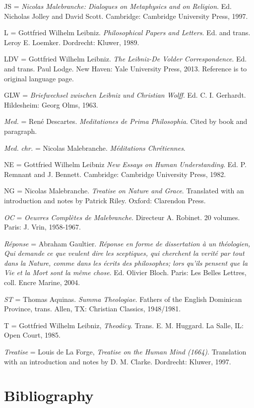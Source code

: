 \documentclass{article}
\begin{document}
JS = \emph{Nicolas Malebranche: Dialogues on Metaphysics and on
Religion}. Ed. Nicholas Jolley and David Scott. Cambridge: Cambridge
University Press, 1997.

L = Gottfried Wilhelm Leibniz. \emph{Philosophical Papers and Letters}.
Ed. and trans. Leroy E. Loemker. Dordrecht: Kluwer, 1989.

LDV = Gottfried Wilhelm Leibniz. \emph{The Leibniz-De Volder
Correspondence}. Ed. and trans. Paul Lodge. New Haven: Yale University
Press, 2013. Reference is to original language page.

GLW = \emph{Briefwechsel zwischen Leibniz und Christian Wolff}. Ed. C.
I. Gerhardt. Hildesheim: Georg Olms, 1963.

\emph{Med.} = René Descartes. \emph{Meditationes de Prima Philosophia}.
Cited by book and paragraph.

\emph{Med.} \emph{chr.} = Nicolas Malebranche. \emph{Méditations
Chrétiennes}.

NE = Gottfried Wilhelm Leibniz \emph{New Essays on Human Understanding}.
Ed. P. Remnant and J. Bennett. Cambridge: Cambridge University Press,
1982.

NG = Nicolas Malebranche. \emph{Treatise on Nature and Grace}.
Translated with an introduction and notes by Patrick Riley. Oxford:
Clarendon Press.

\emph{OC} = \emph{Oeuvres Complètes de Malebranche}. Directeur A.
Robinet. 20 volumes. Paris: J. Vrin, 1958-1967.

\emph{Réponse} = Abraham Gaultier. \emph{Réponse en forme de
dissertation à un théologien, Qui demande ce que veulent dire les
sceptiques, qui cherchent la verité par tout dans la Nature, comme dans
les écrits des philosophes; lors qu'ils pensent que la Vie et la Mort
sont la même chose}. Ed. Olivier Bloch. Paris: Les Belles Lettres, coll.
Encre Marine, 2004.

\emph{ST} = Thomas Aquinas. \emph{Summa Theologiae}. Fathers of the
English Dominican Province, trans. Allen, TX: Christian Classics,
1948/1981.

T = Gottfried Wilhelm Leibniz, \emph{Theodicy}. Trans. E. M. Huggard. La
Salle, IL: Open Court, 1985.

\emph{Treatise} = Louis de La Forge, \emph{Treatise on the Human Mind
(1664)}. Translation with an introduction and notes by D. M. Clarke.
Dordrecht: Kluwer, 1997.

\section{Bibliography}
\end{document}
